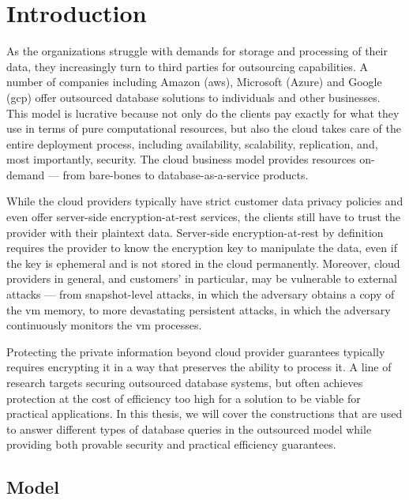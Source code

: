 \chapter{Introduction}
\thispagestyle{myheadings}

	As the organizations struggle with demands for storage and processing of their data, they increasingly turn to third parties for outsourcing capabilities.
	A number of companies including Amazon (\acrshort{aws}), Microsoft (Azure) and Google (\acrshort{gcp}) offer outsourced database solutions to individuals and other businesses.
	This model is lucrative because not only do the clients pay exactly for what they use in terms of pure computational resources, but also the cloud takes care of the entire deployment process, including availability, scalability, replication, and, most importantly, security.
	The cloud business model provides resources on-demand --- from bare-bones  to database-as-a-service products.

	While the cloud providers typically have strict customer data privacy policies and even offer server-side encryption-at-rest services, the clients still have to trust the provider with their plaintext data.
	Server-side encryption-at-rest by definition requires the provider to know the encryption key to manipulate the data, even if the key is ephemeral and is not stored in the cloud permanently.
	Moreover, cloud providers in general, and customers'  in particular, may be vulnerable to external attacks --- from snapshot-level attacks, in which the adversary obtains a copy of the \acrshort{vm} memory, to more devastating persistent attacks, in which the adversary continuously monitors the \acrshort{vm} processes.

	Protecting the private information beyond cloud provider guarantees typically requires encrypting it in a way that preserves the ability to process it.
	A line of research targets securing outsourced database systems, but often achieves protection at the cost of efficiency too high for a solution to be viable for practical applications.
	In this thesis, we will cover the constructions that are used to answer different types of database queries in the outsourced model while providing both provable security and practical efficiency guarantees.

	\section{Model}

